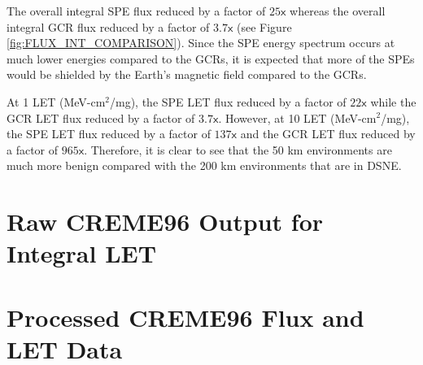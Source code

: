 \documentclass{hitec}
\begin{document}
The overall integral SPE flux reduced by a factor of $25\textsf{x}$ whereas the overall integral GCR flux reduced by a factor of $3.7\textsf{x}$ (see Figure \ref{fig:FLUX_INT_COMPARISON}). Since the SPE energy spectrum occurs at much lower energies compared to the GCRs, it is expected that more of the SPEs would be shielded by the Earth's magnetic field compared to the GCRs.

At 1 LET (MeV-cm$^2$/mg), the SPE LET flux reduced by a factor of $22\textsf{x}$ while the GCR LET flux reduced by a factor of $3.7\textsf{x}$. However, at 10 LET (MeV-cm$^2$/mg), the SPE LET flux reduced by a factor of $137\textsf{x}$ and the GCR LET flux reduced by a factor of $965\textsf{x}$. Therefore, it is clear to see that the 50 km environments are much more benign compared with the 200 km environments that are in DSNE.



\newpage
\appendix
{}
\section{Raw CREME96 Output for Integral LET}
\label{asec:RawCREME96Output}











\section{Processed CREME96 Flux and LET Data}
\label{asec:ProcessCREME96Data}


\end{document}
